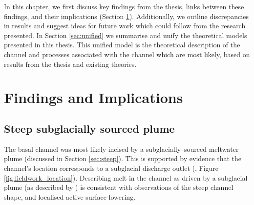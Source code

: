 







In this chapter, we first  discuss key findings from the thesis, links between these findings, and their implications (Section \ref{sec:findings}). Additionally, we outline discrepancies in results and suggest ideas for future work which could follow from the research presented.
In Section \ref{sec:unified}  we summarise and unify the theoretical models presented in this thesis. This unified model is the theoretical description of the channel and processes associated with the channel which are most likely, based on results from the thesis and existing theories.


\section{Findings and Implications} \label{sec:findings}


\subsection{Steep subglacially sourced plume}

The basal channel was most likely incised by a subglacially--sourced meltwater plume (discussed in Section \ref{sec:steep}). This is supported by evidence that the channel's location corresponds to a  subglacial discharge outlet (\cite{alley2016impacts,le2009subglacial}, Figure \ref{fig:fieldwork_location}).
Describing melt in the channel as driven by a subglacial plume (as described by \cite{jenkins1991one}) is consistent with observations of the steep channel shape, and localised active surface lowering.

